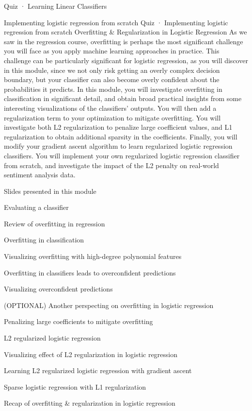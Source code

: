 Quiz · Learning Linear Classifiers
\item Implementing logistic regression from scratch
Quiz · Implementing logistic regression from scratch
Overfitting & Regularization in Logistic Regression
As we saw in the regression course, overfitting is perhaps the most significant challenge you will face as you apply machine learning approaches in practice. This challenge can be particularly significant for logistic regression, as you will discover in this module, since we not only risk getting an overly complex decision boundary, but your classifier can also become overly confident about the probabilities it predicts. In this module, you will investigate overfitting in classification in significant detail, and obtain broad practical insights from some interesting visualizations of the classifiers' outputs. You will then add a regularization term to your optimization to mitigate overfitting. You will investigate both L2 regularization to penalize large coefficient values, and L1 regularization to obtain additional sparsity in the coefficients. Finally, you will modify your gradient ascent algorithm to learn regularized logistic regression classifiers. You will implement your own regularized logistic regression classifier from scratch, and investigate the impact of the L2 penalty on real-world sentiment analysis data.
\item Slides presented in this module
\item Evaluating a classifier
\item Review of overfitting in regression
\item Overfitting in classification
\item Visualizing overfitting with high-degree polynomial features
\item Overfitting in classifiers leads to overconfident predictions
\item Visualizing overconfident predictions
\item (OPTIONAL) Another perspecting on overfitting in logistic regression
\item Penalizing large coefficients to mitigate overfitting
\item L2 regularized logistic regression
\item Visualizing effect of L2 regularization in logistic regression
\item Learning L2 regularized logistic regression with gradient ascent
\item Sparse logistic regression with L1 regularization
\item Recap of overfitting & regularization in logistic regression
